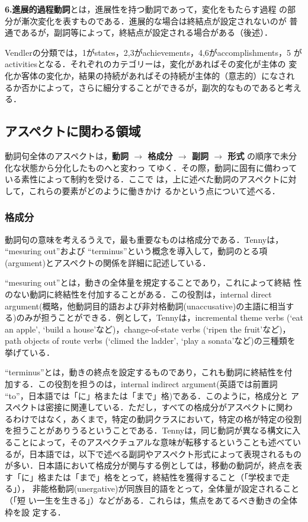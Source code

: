 {\bf 6.進展的過程動詞}とは，進展性を持つ動詞であって，変化をもたらす過程
の部分が漸次変化を表すものである．進展的な場合は終結点が設定されないのが
普通であるが，副詞等によって，終結点が設定される場合がある（後述）．

Vendlerの分類では，1がstates，2,3がachievements，4,6がaccomplishments，5
がactivitiesとなる．それぞれのカテゴリーは，変化があればその変化が主体の
変化か客体の変化か，結果の持続があればその持続が主体的（意志的）になされ
るか否かによって，さらに細分することができるが，副次的なものであると考え
る．

\subsection{アスペクトに関わる領域}

動詞句全体のアスペクトは，{\bf 動詞 $\rightarrow$ 格成分 $\rightarrow$ 
  副詞 $\rightarrow$ 形式} の順序で未分化な状態から分化したものへと変わっ
てゆく．その際，動詞に固有に備わっている素性によって制約を受ける．ここで
は，上に述べた動詞のアスペクトに対して，これらの要素がどのように働きかけ
るかという点について述べる．

\subsubsection{格成分}

動詞句の意味を考えるうえで，最も重要なものは格成分である．Tennyは， 
``mesuring out''および ``terminus''という概念を導入して，動詞のとる項
(argument)とアスペクトの関係を詳細に記述している\cite{Tenny94}．

``mesuring out''とは，動きの全体量を規定することであり，これによって終結
性のない動詞に終結性を付加することがある．この役割は，internal direct
argument(概略，他動詞目的語および非対格動詞(unaccusative)の主語に相当す
る)のみが担うことができる．例として，Tennyは，incremental theme verbs
(`eat an apple', `build a house'など)，change-of-state verbs (`ripen the
fruit'など)，path objects of route verbs (`climed the ladder', `play a
sonata'など)の三種類を挙げている．

``terminus''とは，動きの終点を設定するものであり，これも動詞に終結性を付
加する．この役割を担うのは，internal indirect argument(英語では前置詞 
``to''，日本語では「に」格または「まで」格)である．このように，格成分と
アスペクトは密接に関連している．ただし，すべての格成分がアスペクトに関わ
るわけではなく，あくまで，特定の動詞クラスにおいて，特定の格が特定の役割
を担うことがありうるということである．Tennyは，同じ動詞が異なる構文に入
ることによって，そのアスペクチュアルな意味が転移するということも述べてい
るが，日本語では，以下で述べる副詞やアスペクト形式によって表現されるもの
が多い．日本語において格成分が関与する例としては，移動の動詞が，終点を表
す「に」格または「まで」格をとって，終結性を獲得すること（「学校まで走る」），
非能格動詞(unergative)が同族目的語をとって，全体量が設定されること（「短
い一生を生きる」）などがある．これらは，焦点をあてるべき動きの全体枠を設
定する．

